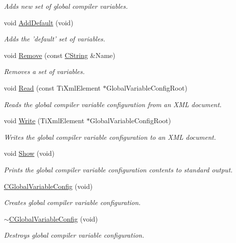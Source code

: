 \begin{DoxyCompactItemize}
\begin{DoxyCompactList}\small\item\em Adds new set of global compiler variables. \end{DoxyCompactList}\item 
void \hyperlink{classCGlobalVariableConfig_a5e35aeefba0d66385508454896a274fb}{Add\-Default} (void)
\begin{DoxyCompactList}\small\item\em Adds the 'default' set of variables. \end{DoxyCompactList}\item 
void \hyperlink{classCGlobalVariableConfig_a1ccd44e97ef79a815e9409ea6b7eb2cd}{Remove} (const \hyperlink{classCString}{C\-String} \&Name)
\begin{DoxyCompactList}\small\item\em Removes a set of variables. \end{DoxyCompactList}\item 
void \hyperlink{classCGlobalVariableConfig_a090f07dc4c04440e0c2179806ea11550}{Read} (const Ti\-Xml\-Element $\ast$Global\-Variable\-Config\-Root)
\begin{DoxyCompactList}\small\item\em Reads the global compiler variable configuration from an X\-M\-L document. \end{DoxyCompactList}\item 
void \hyperlink{classCGlobalVariableConfig_a0d2b06679de9b11ed462d6d7ca5fd0c3}{Write} (Ti\-Xml\-Element $\ast$Global\-Variable\-Config\-Root)
\begin{DoxyCompactList}\small\item\em Writes the global compiler variable configuration to an X\-M\-L document. \end{DoxyCompactList}\item 
void \hyperlink{classCGlobalVariableConfig_a4c969184dff8036ffb7f4d3064807de0}{Show} (void)
\begin{DoxyCompactList}\small\item\em Prints the global compiler variable configuration contents to standard output. \end{DoxyCompactList}\item 
\hyperlink{classCGlobalVariableConfig_a1b2d3082e5c01f53abe7ad0d98a587e6}{C\-Global\-Variable\-Config} (void)
\begin{DoxyCompactList}\small\item\em Creates global compiler variable configuration. \end{DoxyCompactList}\item 
\hyperlink{classCGlobalVariableConfig_af745031486e56f2c599fe629097e5de1}{$\sim$\-C\-Global\-Variable\-Config} (void)
\begin{DoxyCompactList}\small\item\em Destroys global compiler variable configuration. \end{DoxyCompactList}\end{DoxyCompactItemize}
